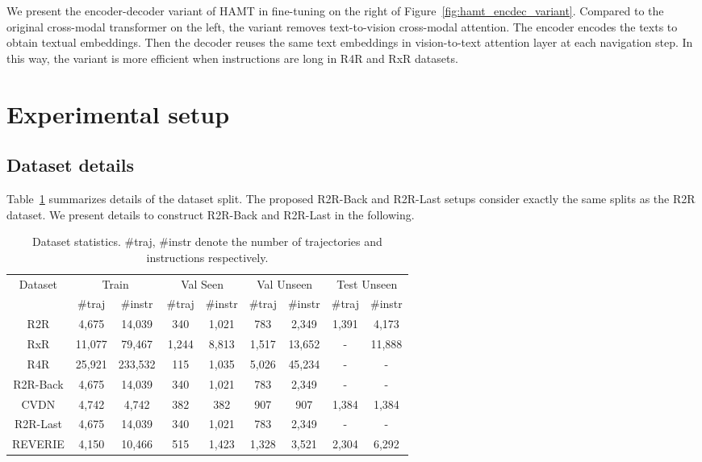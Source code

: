 We present the encoder-decoder variant of HAMT in fine-tuning on the right of Figure~\ref{fig:hamt_encdec_variant}.
Compared to the original cross-modal transformer on the left, the variant removes text-to-vision cross-modal attention. 
The encoder encodes the texts to obtain textual embeddings. Then the decoder reuses the same text embeddings in vision-to-text attention layer at each navigation step.
In this way, the variant is more efficient when instructions are long \eg in R4R and RxR datasets.


\section{Experimental setup}
\label{sec:expr_details}
\subsection{Dataset details}
Table~\ref{tab:dataset_stats} summarizes details of the dataset split.
The proposed R2R-Back and R2R-Last setups consider exactly the same splits as the R2R dataset.
We present details to construct R2R-Back and R2R-Last in the following.

\begin{table}[h]
	\centering
	\small
	\caption{Dataset statistics. \#traj, \#instr  denote the number of trajectories and instructions respectively.}
	\label{tab:dataset_stats}
	\begin{tabular}{ccccccccc} \toprule
		\multirow{2}{*}{Dataset} & \multicolumn{2}{c}{Train} & \multicolumn{2}{c}{Val Seen} & \multicolumn{2}{c}{Val Unseen} & \multicolumn{2}{c}{Test Unseen} \\
		& \#traj & \#instr & \#traj & \#instr & \#traj & \#instr & \#traj & \#instr \\ \midrule
		R2R \cite{anderson2018vision} & 4,675 & 14,039 & 340 & 1,021 & 783 & 2,349 & 1,391 & 4,173 \\
		RxR \cite{ku2020room} & 11,077 & 79,467 & 1,244 & 8,813 & 1,517 & 13,652 & - & 11,888 \\ \midrule
		R4R \cite{jain2019stay} & 25,921 & 233,532 & 115 & 1,035 & 5,026 & 45,234 & - & - \\
		R2R-Back & 4,675 & 14,039 & 340 & 1,021 & 783 & 2,349 & - & - \\ \midrule
		CVDN \cite{thomason2020vision} & 4,742 & 4,742 & 382 & 382 & 907 & 907 & 1,384 & 1,384 \\ \midrule
		R2R-Last & 4,675 & 14,039 & 340 & 1,021 & 783 & 2,349 & - & - \\
		REVERIE \cite{qi2020reverie} & 4,150 & 10,466 & 515 & 1,423 & 1,328 & 3,521 & 2,304 & 6,292 \\ \bottomrule
	\end{tabular}
\end{table}


